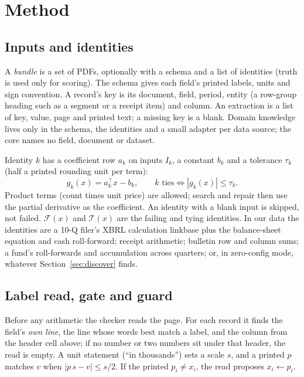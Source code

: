 \documentclass[10pt,twocolumn]{article}
\newcommand{\Fail}{\mathcal{F}}
\newcommand{\Tie}{\mathcal{T}}
\begin{document}
\section{Method}\label{sec:method}

\subsection{Inputs and identities}
A \emph{bundle} is a set of PDFs, optionally with a schema and a list of identities (truth is used only for scoring). The schema gives each field's printed labels, units and sign convention. A record's key is its document, field, period, entity (a row-group heading such as a segment or a receipt item) and column. An extraction is a list of key, value, page and printed text; a missing key is a blank. Domain knowledge lives only in the schema, the identities and a small adapter per data source; the core names no field, document or dataset.

Identity $k$ has a coefficient row $a_k$ on inputs $I_k$, a constant $b_k$ and a tolerance $\tau_k$ (half a printed rounding unit per term):
\begin{equation}\label{eq:check}
g_k(x) = a_k^{\top}x - b_k, \qquad \text{$k$ ties} \iff |g_k(x)| \le \tau_k .
\end{equation}
Product terms (count times unit price) are allowed; search and repair then use the partial derivative as the coefficient. An identity with a blank input is skipped, not failed. $\Fail(x)$ and $\Tie(x)$ are the failing and tying identities. In our data the identities are a 10-Q filer's XBRL calculation linkbase plus the balance-sheet equation and cash roll-forward; receipt arithmetic; bulletin row and column sums; a fund's roll-forwards and accumulation across quarters; or, in zero-config mode, whatever Section~\ref{sec:discover} finds.

\subsection{Label read, gate and guard}\label{sec:labelread}
Before any arithmetic the checker reads the page. For each record it finds the field's \emph{own line}, the line whose words best match a label, and the column from the header cell above; if no number or two numbers sit under that header, the read is empty. A unit statement (``in thousands'') sets a scale $s$, and a printed $p$ matches $v$ when $|p\,s-v|\le s/2$. If the printed $p_i\neq x_i$, the read proposes $x_i\leftarrow p_i$.
\end{document}
